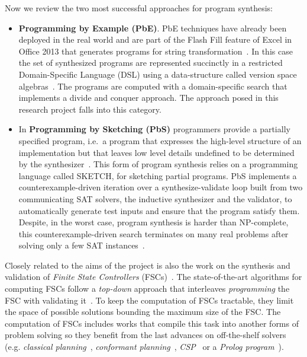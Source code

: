 \documentclass[10pt,a4paper]{paper}
\begin{document}
Now we review the two most successful approaches for program synthesis:
\begin{itemize}
\item{\bf Programming by Example (PbE)}. PbE techniques have already been deployed in the real world and are part of the {\sc Flash Fill} feature of Excel in Office 2013 that generates programs for string transformation~\cite{gulwani2011automating}. In this case the set of synthesized programs are represented succinctly in a restricted Domain-Specific Language (DSL) using a data-structure called version space algebras~\cite{mitchell1982generalization}. The programs are computed with a domain-specific search that implements a divide and conquer approach. The approach posed in this research project falls into this category.

\item In {\bf Programming by Sketching (PbS)} programmers provide a partially specified program, i.e.~a program that expresses the high-level structure of an implementation but that leaves low level details undefined to be determined by the synthesizer~\cite{solar2006combinatorial}. This form of program synthesis relies on a programming language called {\sc SKETCH}, for sketching partial programs. PbS implements a counterexample-driven iteration over a synthesize-validate loop built from two communicating SAT solvers, the inductive synthesizer and the validator, to automatically generate test inputs and ensure that the program satisfy them. Despite, in the worst case, program synthesis is harder than NP-complete, this counterexample-driven search terminates on many real problems after solving only a few SAT instances~\cite{lake2015human}.
\end{itemize}

Closely related to the aims of the project is also the work on the synthesis and validation of {\it Finite State Controllers} (FSCs)~\cite{geffner:policies:IJCAI15}. The state-of-the-art algorithms for computing FSCs follow a {\it top-down} approach that interleaves {\it programming} the FSC with validating it~\cite{sergio:aprograming:ijcai16}. To keep the computation of FSCs tractable, they limit the space of possible solutions bounding the maximum size of the FSC. The computation of FSCs includes works that compile this task into another forms of problem solving so they benefit from the last advances on off-the-shelf solvers (e.g. {\em classical planning}~\cite{sergio:aprograming:icaps16}, {\em conformant planning}~\cite{Geffner:FSM:AAAI10}, {\em CSP}~\cite{Infantes:FSC:ECAI2010} or a {\em Prolog program}~\cite{Giacomo:FSM:ICAPS13}). 
\end{document}

